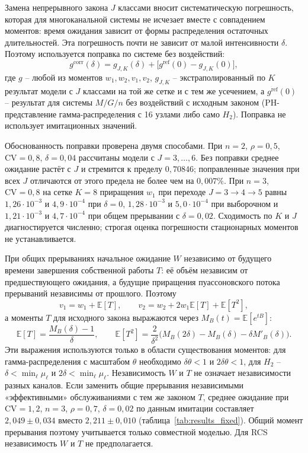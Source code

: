 \documentclass[a4paper,12pt]{article}
\begin{document}
Замена непрерывного закона \(J\) классами вносит систематическую погрешность, которая для многоканальной системы не исчезает вместе с совпадением моментов: время ожидания зависит от формы распределения остаточных длительностей. Эта погрешность почти не зависит от малой интенсивности \(\delta\). Поэтому используется поправка по системе без воздействий:
\[
g^{\mathrm{corr}}(\delta)=g_{J,K}(\delta)+\bigl[g^{\mathrm{ref}}(0)-g_{J,K}(0)\bigr],
\]
где \(g\) -- любой из моментов \(w_1,w_2,v_1,v_2\), \(g_{J,K}\) -- экстраполированный по \(K\) результат модели с \(J\) классами на той же сетке и с тем же усечением, а \(g^{\mathrm{ref}}(0)\) -- результат для системы \(M/G/n\) без воздействий с исходным законом (PH-представление гамма-распределения с 16 узлами либо само \(H_2\)). Поправка не использует имитационных значений.

Обоснованность поправки проверена двумя способами. При \(n=2\), \(\rho=0{,}5\), \(\mathrm{CV}=0{,}8\), \(\delta=0{,}04\) рассчитаны модели с \(J=3,\ldots,6\). Без поправки среднее ожидание растёт с \(J\) и стремится к пределу \(0{,}70846\); поправленные значения при всех \(J\) отличаются от этого предела не более чем на \(0{,}007\%\). При \(n=3\), \(\mathrm{CV}=0{,}8\) на сетке \(K=8\) приращения \(w_1\) при переходе \(J=3\to4\to5\) равны \(1{,}26\cdot10^{-3}\) и \(4{,}9\cdot10^{-4}\) при \(\delta=0\), \(1{,}28\cdot10^{-3}\) и \(5{,}0\cdot10^{-4}\) при выборочном и \(1{,}21\cdot10^{-3}\) и \(4{,}7\cdot10^{-4}\) при общем прерывании с \(\delta=0{,}02\). Сходимость по \(K\) и \(J\) диагностируется численно; строгая оценка погрешности стационарных моментов не устанавливается.

При общих прерываниях начальное ожидание \(W\) независимо от будущего времени завершения собственной работы \(T\): её объём независим от предшествующего ожидания, а будущие приращения пуассоновского потока прерываний независимы от прошлого. Поэтому
\[
v_1=w_1+\mathbb E[T],\qquad
v_2=w_2+2w_1\mathbb E[T]+\mathbb E[T^2],
\]
а моменты \(T\) для исходного закона выражаются через \(M_B(t)=\mathbb E[e^{tB}]\):
\[
\mathbb E[T]=\frac{M_B(\delta)-1}{\delta},\qquad
\mathbb E[T^2]=\frac{2}{\delta^2}\bigl(M_B(2\delta)-M_B(\delta)-\delta M'_B(\delta)\bigr).
\]
Эти выражения используются только в области существования моментов: для гамма-распределения с масштабом \(\theta\) необходимо \(\delta\theta<1\) и \(2\delta\theta<1\), для \(H_2\) -- \(\delta<\min_\ell\mu_\ell\) и \(2\delta<\min_\ell\mu_\ell\). Независимость \(W\) и \(T\) не означает независимости разных каналов. Если заменить общие прерывания независимыми «эффективными» обслуживаниями с тем же законом \(T\), среднее ожидание при \(\mathrm{CV}=1{,}2\), \(n=3\), \(\rho=0{,}7\), \(\delta=0{,}02\) по данным имитации составляет \(2{,}049\pm0{,}034\) вместо \(2{,}211\pm0{,}010\) (таблица~\ref{tab:results_fixed}). Общий момент прерывания поэтому учитывается только совместной моделью. Для RCS независимость \(W\) и \(T\) не предполагается.
\end{document}
